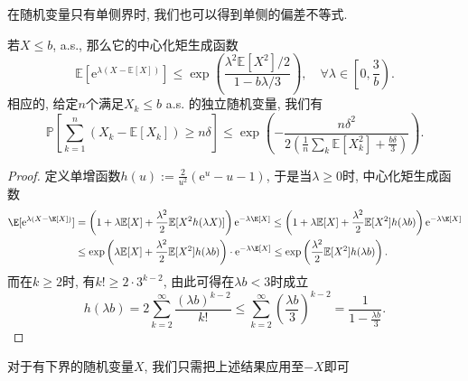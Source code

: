 在随机变量只有单侧界时, 我们也可以得到单侧的偏差不等式. 
\begin{proposition}[单侧Bernstein不等式]\label{prop:oneSideBernsteinIneq}
	若$X \leq b$, a.s., 那么它的中心化矩生成函数
	\begin{equation*}
		\mathbb{E}[\mathrm{e}^{\lambda(X - \mathbb{E}[X])}] \leq \exp \left(\frac{\lambda^2 \mathbb{E}[X^2] / 2}{1 - b \lambda / 3}\right), \quad \forall \lambda \in \left[ 0, \frac{3}{b} \right). 
	\end{equation*}
	相应的, 给定$n$个满足$X_k \leq b$ a.s. 的独立随机变量, 我们有
	\begin{equation*}
		\mathbb{P} \left[ \sum_{k=1}^n (X_k - \mathbb{E}[X_k]) \geq n \delta \right]
		\leq \exp \left(- \frac{n \delta^2}{2\left( \frac{1}{n} \sum_k \mathbb{E}[X_k^2] + \frac{b \delta}{3} \right)} \right). 
	\end{equation*}
\end{proposition}
\begin{proof}
	定义单增函数$h(u) := \frac{2}{u^2} (\mathrm{e}^u - u - 1)$, 于是当$\lambda \geq 0$时, 中心化矩生成函数
	\begin{align*}
		\E[\mathrm{e}^{\lambda (X - \E[X])}] 
		& = \left(1 + \lambda \mathbb{E}[X] + \frac{\lambda^2}{2} \mathbb{E}[X^2 h(\lambda X)]\right) \mathrm{e}^{-\lambda \E[X]}
		\leq  \left( 1 + \lambda \mathbb{E}[X] + \frac{\lambda^2}{2} \mathbb{E}[X^2] h(\lambda b) \right) \mathrm{e}^{-\lambda \E[X]} \\
		& \leq  \exp\left(\lambda \mathbb{E}[X] + \frac{\lambda^2}{2} \mathbb{E}[X^2] h(\lambda b)\right) \cdot \mathrm{e}^{-\lambda \E[X]}
		\leq \exp\left(\frac{\lambda^2}{2} \mathbb{E}[X^2] h(\lambda b)\right).
	\end{align*}
	而在$k \geq 2$时, 有$k! \geq 2 \cdot 3^{k-2}$, 由此可得在$\lambda b < 3$时成立
	\begin{equation*}
		h(\lambda b) 
		= 2 \sum_{k=2}^{\infty} \frac{(\lambda b)^{k-2}}{k!} 
		\leq \sum_{k=2}^{\infty} \left(\frac{\lambda b}{3}\right)^{k-2}
		= \frac{1}{1 - \frac{\lambda b}{3}}. 
	\end{equation*}
\end{proof}
\begin{remark}
	对于有下界的随机变量$X$, 我们只需把上述结果应用至$-X$即可
\end{remark}



